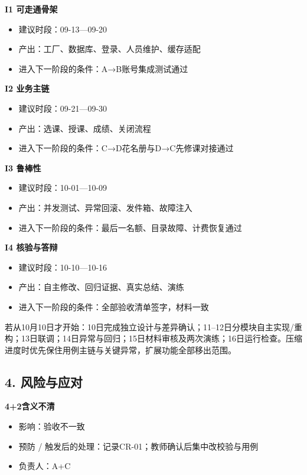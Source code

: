 \documentclass[UTF8,11pt,a4paper]{ctexart}
\providecommand{\tightlist}{\setlength{\itemsep}{0pt}\setlength{\parskip}{0pt}}
\begin{document}
\textbf{I1 可走通骨架}

\begin{itemize}
\tightlist
\item
  建议时段：09-13---09-20
\item
  产出：工厂、数据库、登录、人员维护、缓存适配
\item
  进入下一阶段的条件：A→B账号集成测试通过
\end{itemize}

\textbf{I2 业务主链}

\begin{itemize}
\tightlist
\item
  建议时段：09-21---09-30
\item
  产出：选课、授课、成绩、关闭流程
\item
  进入下一阶段的条件：C→D花名册与D→C先修课对接通过
\end{itemize}

\textbf{I3 鲁棒性}

\begin{itemize}
\tightlist
\item
  建议时段：10-01---10-09
\item
  产出：并发测试、异常回滚、发件箱、故障注入
\item
  进入下一阶段的条件：最后一名额、目录故障、计费恢复通过
\end{itemize}

\textbf{I4 核验与答辩}

\begin{itemize}
\tightlist
\item
  建议时段：10-10---10-16
\item
  产出：自主修改、回归证据、真实总结、演练
\item
  进入下一阶段的条件：全部验收清单签字，材料一致
\end{itemize}

若从10月10日才开始：10日完成独立设计与差异确认；11--12日分模块自主实现/重构；13日联调；14日异常与回归；15日材料审核及两次演练；16日运行检查。压缩进度时优先保住用例主链与关键异常，扩展功能全部移出范围。

\hypertarget{4-ux98ceux9669ux4e0eux5e94ux5bf9}{%
\subsection{4. 风险与应对}\label{4-ux98ceux9669ux4e0eux5e94ux5bf9}}

\textbf{4+2含义不清}

\begin{itemize}
\tightlist
\item
  影响：验收不一致
\item
  预防 / 触发后的处理：记录CR-01；教师确认后集中改校验与用例
\item
  负责人：A+C
\end{itemize}
\end{document}
